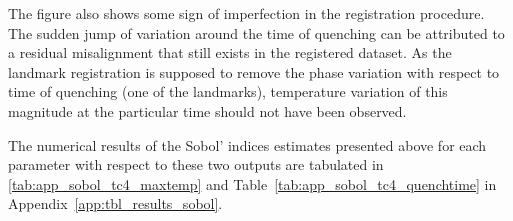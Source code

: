 The figure also shows some sign of imperfection in the registration procedure.
The sudden jump of variation around the time of quenching can be attributed to a residual misalignment that still exists in the registered dataset.
As the landmark registration is supposed to remove the phase variation with respect to time of quenching (one of the landmarks),
temperature variation of this magnitude at the particular time should not have been observed.

The numerical results of the Sobol' indices estimates presented above for each parameter with respect to these two outputs are tabulated in \ref{tab:app_sobol_tc4_maxtemp} and Table~\ref{tab:app_sobol_tc4_quenchtime} in Appendix~\ref{app:tbl_results_sobol}.
